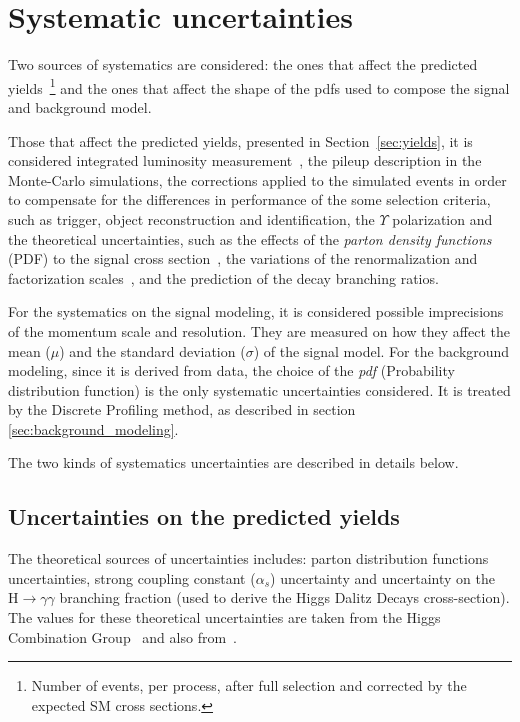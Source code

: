 \section{Systematic uncertainties}

Two sources of systematics are considered: the ones that affect the predicted yields~\footnote{Number of events, per process, after full selection and corrected by the expected SM cross sections.} and the ones that affect the shape of the pdfs used to compose the signal and background model.

Those that affect the predicted yields, presented in Section~\ref{sec:yields}, it is considered integrated luminosity measurement~\cite{CMS-PAS-LUM-17-001}, the pileup description in the Monte-Carlo simulations, the corrections applied to the simulated events in order to compensate for the differences in performance of the some selection criteria, such as trigger, object reconstruction and identification, the $\Upsilon$ polarization and the theoretical uncertainties, such as the effects of the \textit{parton density functions} (PDF) to the signal cross section~\cite{NNPDF3,deFlorian:2016spz,Butterworth:2015oua}, the variations of the renormalization and factorization scales~\cite{Martin:2009iq,Lai:2010vv,Alekhin:2011sk,Botje:2011sn,Ball:2011mu}, and the prediction of the decay branching ratios. 

For the systematics on the signal modeling, it is considered possible imprecisions of the momentum scale and resolution. They are measured on how they affect the mean ($\mu$) and the standard deviation ($\sigma$) of the signal model. For the background modeling, since it is derived from data, the choice of the \textit{pdf} (Probability distribution function) is the only systematic uncertainties considered. It is treated by the Discrete Profiling method, as described in section \ref{sec:background_modeling}. 

The two kinds of systematics uncertainties are described in details below.

\subsection{Uncertainties on the predicted yields}

The theoretical sources of uncertainties includes: parton distribution functions uncertainties, strong coupling constant ($\alpha_{s}$) uncertainty and uncertainty on the $\mathrm{H} \to \gamma\gamma$ branching fraction (used to derive the Higgs Dalitz Decays cross-section). The values for these theoretical uncertainties are taken from the Higgs Combination Group~\cite{CERNYellowReportPageAt13TeV} and also from~\cite{Passarino:2013nka,Botje:2011sn}.

